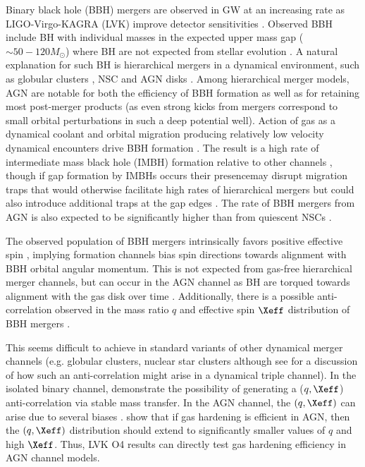 Binary black hole (BBH) mergers are observed in GW at an increasing rate as LIGO-Virgo-KAGRA (LVK) improve detector sensitivities \citep[e.g.][ see also \footnote{https://gracedb.ligo.org/superevents/public/O4/}]{Abbott+20-GW190521astro}.
Observed BBH include BH with individual masses in the expected upper mass gap ($\sim 50-120M_{\odot}$) where BH are not expected from stellar evolution \citep{Belcynzski+16,RenzoSmith24}.
A natural explanation for such BH is hierarchical mergers in a dynamical environment, such as globular clusters \citep{Rodriguez+18}, NSC \citep{Antonini&Rasio16,Hoang+18,Fragione+19} and AGN disks \citep{McKernan+12,McKernan+14,Bartos+17,StoneMetzgerHaiman17, ArcaSedda23,FordMcKernan25}.
Among hierarchical merger models, AGN are notable for both the efficiency of BBH formation as well as for retaining most post-merger products (as even strong kicks from mergers correspond to small orbital perturbations in such a deep potential well).
Action of gas as a dynamical coolant and orbital migration producing relatively low velocity dynamical encounters drive BBH formation \citep[e.g.][]{Rowan+23,QianLiLai24,DodiciTremaine24}.
The result is a high rate of intermediate mass black hole (IMBH) formation relative to other channels \citep{McKernan+12,Bellovary+16,Secunda+21,Yang+19,McKernan+20a,TagawaHaimanKocsis20,Vaccaro+24}, though if gap formation by IMBHs occurs their presencemay disrupt migration traps that would otherwise facilitate high rates of hierarchical mergers \citep{Gilbaum+25} but could also introduce additional traps at the gap edges \citep{Horn+12}.
The rate of BBH mergers from AGN is also expected to be significantly higher than from quiescent NSCs \citep{FordMcKernan22}.

The observed population of BBH mergers intrinsically favors positive effective spin \citep{Abbott+23-O3b}, implying formation channels bias spin directions towards alignment with BBH orbital angular momentum.
This is not expected from gas-free hierarchical merger channels, but can occur in the AGN channel as BH are torqued towards alignment with the gas disk over time \citep{Tagawa+20spin,Vajpeyi+22,McKernanFord24}.
Additionally, there is a possible anti-correlation observed in the mass ratio $q$ and effective spin $\Xeff$ distribution of BBH mergers \citep{Callister+21}.

This seems difficult to achieve in standard variants of other dynamical merger channels (e.g.
globular clusters, nuclear star clusters although see \citet{Su25} for a discussion of how such an anti-correlation might arise in a dynamical triple channel).
In the isolated binary channel, \citep[e.g.][]{Olejak+24,BanerjeeOlejak24} demonstrate the possibility of generating a ($q,\Xeff$) anti-correlation via stable mass transfer.
In the AGN channel, the $(q,\Xeff)$ can arise due to several biases \citep{Mckernan+22:q-Xeff,Santini+23, DittmannDempseyLi24}.
\citet{Vaccaro+24} show that if gas hardening is efficient in AGN, then the $(q,\Xeff)$ distribution should extend to significantly smaller values of $q$ and high $\Xeff$.
Thus, LVK O4 results can directly test gas hardening efficiency in AGN channel models.

